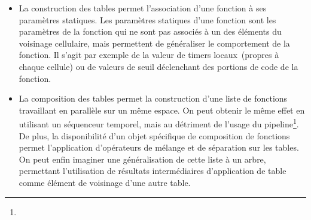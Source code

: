 \begin{itemize}
\item%
  La construction des tables permet l'association d'une fonction à ses
  paramètres statiques. %
  Les paramètres statiques d'une fonction sont les paramètres de la
  fonction qui ne sont pas associés à un des éléments du voisinage
  cellulaire, mais permettent de généraliser le comportement de la
  fonction. %
  Il s'agit par exemple de la valeur de timers locaux~(propres à
  chaque cellule) ou de valeurs de seuil déclenchant des portions de
  code de la fonction. %

\item%
  La composition des tables permet la construction d'une liste de
  fonctions travaillant en parallèle sur un même espace. %
  On peut obtenir le même effet en utilisant un séquenceur temporel,
  mais au détriment de l'usage du pipeline\footnote{%
    }. %
  De plus, la disponibilité d'un objet spécifique de composition de
  fonctions permet l'application d'opérateurs de mélange et de
  séparation sur les tables. %
  On peut enfin imaginer une généralisation de cette liste à un arbre,
  permettant l'utilisation de résultats intermédiaires d'application
  de table comme élément de voisinage d'une autre table. %


\end{itemize}
